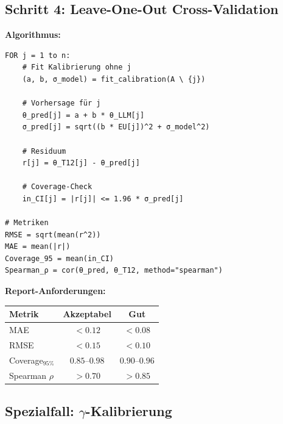 \subsection{Schritt 4: Leave-One-Out Cross-Validation}

\begin{tcolorbox}[colback=gray!5!white, colframe=gray!75!black,
    title=\textbf{Protokoll HHH-UNMAPPED_CAL-1: LOO-Validierung}]

\textbf{Algorithmus:}
\begin{verbatim}
FOR j = 1 to n:
    # Fit Kalibrierung ohne j
    (a, b, σ_model) = fit_calibration(A \ {j})

    # Vorhersage für j
    θ_pred[j] = a + b * θ_LLM[j]
    σ_pred[j] = sqrt((b * EU[j])^2 + σ_model^2)

    # Residuum
    r[j] = θ_T12[j] - θ_pred[j]

    # Coverage-Check
    in_CI[j] = |r[j]| <= 1.96 * σ_pred[j]

# Metriken
RMSE = sqrt(mean(r^2))
MAE = mean(|r|)
Coverage_95 = mean(in_CI)
Spearman_ρ = cor(θ_pred, θ_T12, method="spearman")
\end{verbatim}

\textbf{Report-Anforderungen:}
\begin{center}
\renewcommand{\arraystretch}{1.2}
\begin{tabular}{@{}lcc@{}}
\toprule
\textbf{Metrik} & \textbf{Akzeptabel} & \textbf{Gut} \\
\midrule
MAE & $< 0.12$ & $< 0.08$ \\
RMSE & $< 0.15$ & $< 0.10$ \\
Coverage$_{95\%}$ & $0.85$--$0.98$ & $0.90$--$0.96$ \\
Spearman $\rho$ & $> 0.70$ & $> 0.85$ \\
\bottomrule
\end{tabular}
\end{center}

\end{tcolorbox}

\subsection{Spezialfall: $\gamma$-Kalibrierung}

